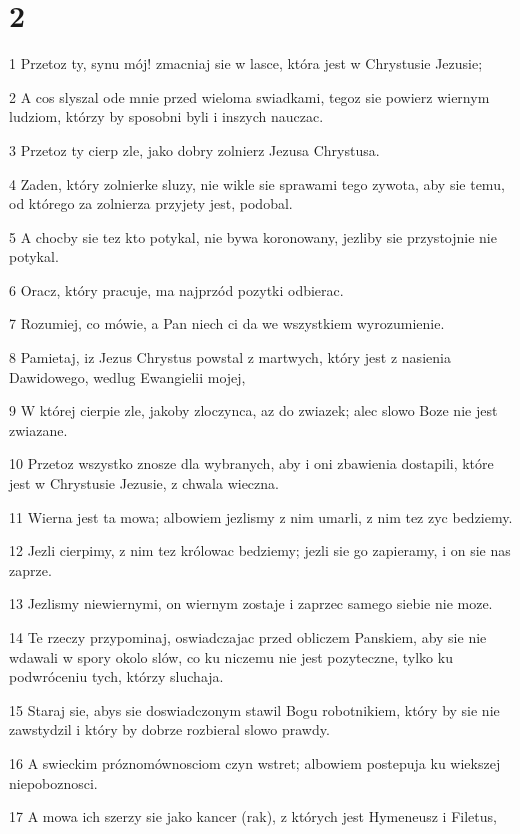 \chapter{2}

\par 1 Przetoz ty, synu mój! zmacniaj sie w lasce, która jest w Chrystusie Jezusie;
\par 2 A cos slyszal ode mnie przed wieloma swiadkami, tegoz sie powierz wiernym ludziom, którzy by sposobni byli i inszych nauczac.
\par 3 Przetoz ty cierp zle, jako dobry zolnierz Jezusa Chrystusa.
\par 4 Zaden, który zolnierke sluzy, nie wikle sie sprawami tego zywota, aby sie temu, od którego za zolnierza przyjety jest, podobal.
\par 5 A chocby sie tez kto potykal, nie bywa koronowany, jezliby sie przystojnie nie potykal.
\par 6 Oracz, który pracuje, ma najprzód pozytki odbierac.
\par 7 Rozumiej, co mówie, a Pan niech ci da we wszystkiem wyrozumienie.
\par 8 Pamietaj, iz Jezus Chrystus powstal z martwych, który jest z nasienia Dawidowego, wedlug Ewangielii mojej,
\par 9 W której cierpie zle, jakoby zloczynca, az do zwiazek; alec slowo Boze nie jest zwiazane.
\par 10 Przetoz wszystko znosze dla wybranych, aby i oni zbawienia dostapili, które jest w Chrystusie Jezusie, z chwala wieczna.
\par 11 Wierna jest ta mowa; albowiem jezlismy z nim umarli, z nim tez zyc bedziemy.
\par 12 Jezli cierpimy, z nim tez królowac bedziemy; jezli sie go zapieramy, i on sie nas zaprze.
\par 13 Jezlismy niewiernymi, on wiernym zostaje i zaprzec samego siebie nie moze.
\par 14 Te rzeczy przypominaj, oswiadczajac przed obliczem Panskiem, aby sie nie wdawali w spory okolo slów, co ku niczemu nie jest pozyteczne, tylko ku podwróceniu tych, którzy sluchaja.
\par 15 Staraj sie, abys sie doswiadczonym stawil Bogu robotnikiem, który by sie nie zawstydzil i który by dobrze rozbieral slowo prawdy.
\par 16 A swieckim próznomównosciom czyn wstret; albowiem postepuja ku wiekszej niepoboznosci.
\par 17 A mowa ich szerzy sie jako kancer (rak), z których jest Hymeneusz i Filetus,
